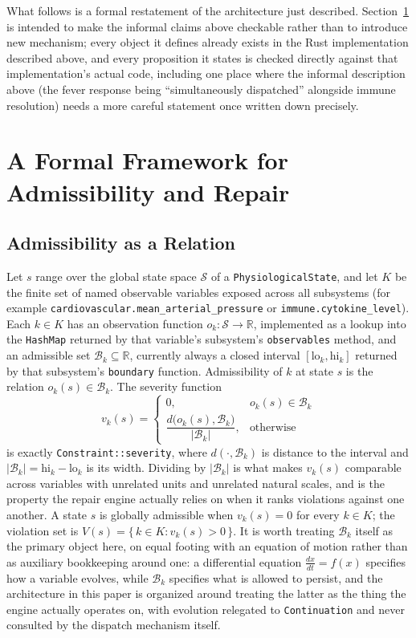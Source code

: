 \documentclass[11pt]{article}
\begin{document}
What follows is a formal restatement of the architecture just described. Section~\ref{sec:formal} is intended to make the informal claims above checkable rather than to introduce new mechanism; every object it defines already exists in the Rust implementation described above, and every proposition it states is checked directly against that implementation's actual code, including one place where the informal description above (the fever response being ``simultaneously dispatched'' alongside immune resolution) needs a more careful statement once written down precisely.

\section{A Formal Framework for Admissibility and Repair}
\label{sec:formal}

\subsection{Admissibility as a Relation}

Let $s$ range over the global state space $\mathcal S$ of a \texttt{PhysiologicalState}, and let $K$ be the finite set of named observable variables exposed across all subsystems (for example \texttt{cardiovascular.mean\_arterial\_pressure} or \texttt{immune.cytokine\_level}). Each $k \in K$ has an observation function $o_k : \mathcal S \rightarrow \mathbb R$, implemented as a lookup into the \texttt{HashMap} returned by that variable's subsystem's \texttt{observables} method, and an admissible set $\mathcal B_k \subseteq \mathbb R$, currently always a closed interval $[\text{lo}_k, \text{hi}_k]$ returned by that subsystem's \texttt{boundary} function. Admissibility of $k$ at state $s$ is the relation $o_k(s) \in \mathcal B_k$. The severity function
\[
v_k(s) =
\begin{cases}
0, & o_k(s) \in \mathcal B_k \\
\dfrac{d\big(o_k(s), \mathcal B_k\big)}{|\mathcal B_k|}, & \text{otherwise}
\end{cases}
\]
is exactly \texttt{Constraint::severity}, where $d(\cdot, \mathcal B_k)$ is distance to the interval and $|\mathcal B_k| = \text{hi}_k - \text{lo}_k$ is its width. Dividing by $|\mathcal B_k|$ is what makes $v_k(s)$ comparable across variables with unrelated units and unrelated natural scales, and is the property the repair engine actually relies on when it ranks violations against one another. A state $s$ is globally admissible when $v_k(s) = 0$ for every $k \in K$; the violation set is $V(s) = \{\, k \in K : v_k(s) > 0 \,\}$. It is worth treating $\mathcal B_k$ itself as the primary object here, on equal footing with an equation of motion rather than as auxiliary bookkeeping around one: a differential equation $\frac{dx}{dt} = f(x)$ specifies how a variable evolves, while $\mathcal B_k$ specifies what is allowed to persist, and the architecture in this paper is organized around treating the latter as the thing the engine actually operates on, with evolution relegated to \texttt{Continuation} and never consulted by the dispatch mechanism itself.
\end{document}
